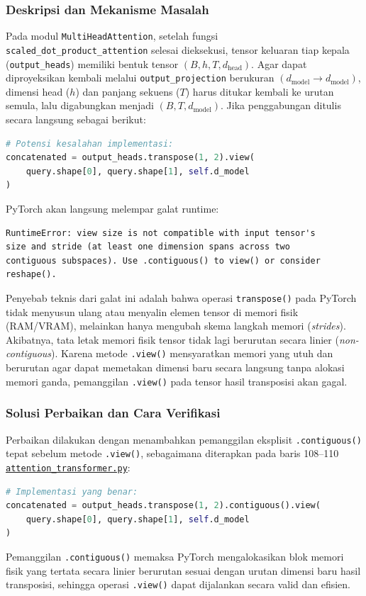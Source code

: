 \documentclass[12pt,a4paper]{article}
\newcommand{\code}[1]{\texttt{\small #1}}
\newcommand{\sourcecodelink}{\href{https://github.com/Universitas-Cakrawala/tugas-deep-learning-sesi-10/blob/main/attention_transformer.py}{\nolinkurl{attention_transformer.py}}}
\begin{document}
\subsubsection{Deskripsi dan Mekanisme Masalah}
Pada modul \code{MultiHeadAttention}, setelah fungsi \code{scaled\_dot\_product\_attention} selesai dieksekusi, tensor keluaran tiap kepala (\code{output\_heads}) memiliki bentuk tensor $(B, h, T, d_{\text{head}})$. Agar dapat diproyeksikan kembali melalui \code{output\_projection} berukuran $(d_{\text{model}} \to d_{\text{model}})$, dimensi head ($h$) dan panjang sekuens ($T$) harus ditukar kembali ke urutan semula, lalu digabungkan menjadi $(B, T, d_{\text{model}})$.
Jika penggabungan ditulis secara langsung sebagai berikut:
\begin{lstlisting}[language=Python]
# Potensi kesalahan implementasi:
concatenated = output_heads.transpose(1, 2).view(
    query.shape[0], query.shape[1], self.d_model
)
\end{lstlisting}
PyTorch akan langsung melempar galat runtime:
\begin{lstlisting}[basicstyle=\ttfamily\small,frame=single]
RuntimeError: view size is not compatible with input tensor's
size and stride (at least one dimension spans across two
contiguous subspaces). Use .contiguous() to view() or consider
reshape().
\end{lstlisting}
Penyebab teknis dari galat ini adalah bahwa operasi \texttt{transpose()} pada PyTorch tidak menyusun ulang atau menyalin elemen tensor di memori fisik (RAM/VRAM), melainkan hanya mengubah skema langkah memori (\emph{strides}). Akibatnya, tata letak memori fisik tensor tidak lagi berurutan secara linier (\emph{non-contiguous}). Karena metode \texttt{.view()} mensyaratkan memori yang utuh dan berurutan agar dapat memetakan dimensi baru secara langsung tanpa alokasi memori ganda, pemanggilan \texttt{.view()} pada tensor hasil transposisi akan gagal.

\subsubsection{Solusi Perbaikan dan Cara Verifikasi}
Perbaikan dilakukan dengan menambahkan pemanggilan eksplisit
\texttt{.contiguous()} tepat sebelum metode \texttt{.view()}, sebagaimana
diterapkan pada baris 108--110 \sourcecodelink:
\begin{lstlisting}[language=Python]
# Implementasi yang benar:
concatenated = output_heads.transpose(1, 2).contiguous().view(
    query.shape[0], query.shape[1], self.d_model
)
\end{lstlisting}
Pemanggilan \texttt{.contiguous()} memaksa PyTorch mengalokasikan blok memori fisik yang tertata secara linier berurutan sesuai dengan urutan dimensi baru hasil transposisi, sehingga operasi \texttt{.view()} dapat dijalankan secara valid dan efisien.
\end{document}
